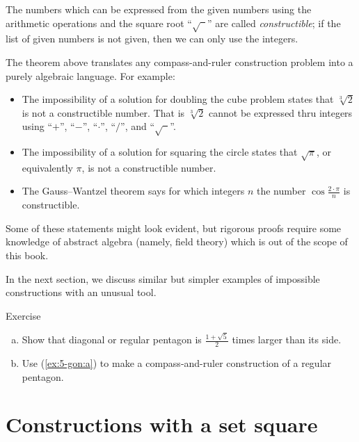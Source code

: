 The numbers which can be expressed from the given numbers using the arithmetic operations and the square root ``$\sqrt{\phantom{a}}$'' are called \emph{constructible};
if the list of given numbers is not given, then we can only use the integers.

{\sloppy
The theorem above translates any compass-and-ruler construction problem into a purely algebraic language.
For example:
\begin{itemize}
\item The impossibility of a solution for doubling the cube problem states that $\sqrt[3]{2}$ is not a constructible number.
That is $\sqrt[3]{2}$ cannot be expressed thru integers using
``$+$'', ``$-$'', ``$\cdot$'', ``$/$'', and ``$\sqrt{\phantom{a}}$''.

\item The impossibility of a solution for squaring the circle states that 
$\sqrt{\pi}$, or equivalently $\pi$, is not a constructible number.

\item The Gauss--Wantzel theorem says for which integers $n$ the number 
$\cos\tfrac{2\cdot\pi}n$ is constructible.
\end{itemize} 
Some of these statements might look evident, 
but rigorous proofs require some knowledge of abstract algebra (namely, field theory)
which is out of the scope of this book. 

}

In the next section, we discuss similar but simpler examples of impossible constructions with an unusual tool.

\begin{thm}{Exercise}\label{ex:5-gon}
\begin{enumerate}[(a)]
 \item\label{ex:5-gon:a} Show that diagonal or regular pentagon is $\tfrac{1+\sqrt5}2$ times larger than its side.
 \item\label{ex:5-gon:b} Use (\ref{ex:5-gon:a}) to make a compass-and-ruler construction of a regular pentagon.
\end{enumerate}
\end{thm}


\section*{Constructions with a set square}

